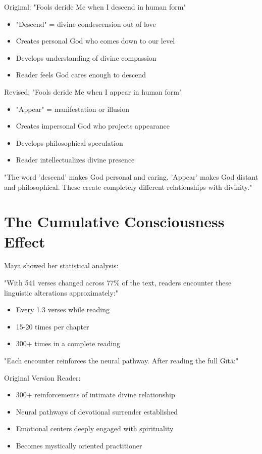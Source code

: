 \documentclass[11pt,twoside]{book}
\begin{document}
Original: "Fools deride Me when I descend in human form"
\begin{itemize}
\item "Descend" = divine condescension out of love
\item Creates personal God who comes down to our level
\item Develops understanding of divine compassion
\item Reader feels God cares enough to descend
\end{itemize}

Revised: "Fools deride Me when I appear in human form"
\begin{itemize}
\item "Appear" = manifestation or illusion
\item Creates impersonal God who projects appearance
\item Develops philosophical speculation
\item Reader intellectualizes divine presence
\end{itemize}

"The word 'descend' makes God personal and caring. 'Appear' makes God distant and philosophical. These create completely different relationships with divinity."
\section*{The Cumulative Consciousness Effect}
\label{sec:org7e80898}

Maya showed her statistical analysis:

"With 541 verses changed across 77\% of the text, readers encounter these linguistic alterations approximately:"
\begin{itemize}
\item Every 1.3 verses while reading
\item 15-20 times per chapter
\item 300+ times in a complete reading
\end{itemize}

"Each encounter reinforces the neural pathway. After reading the full Gītā:"

Original Version Reader:
\begin{itemize}
\item 300+ reinforcements of intimate divine relationship
\item Neural pathways of devotional surrender established
\item Emotional centers deeply engaged with spirituality
\item Becomes mystically oriented practitioner
\end{itemize}
\end{document}
